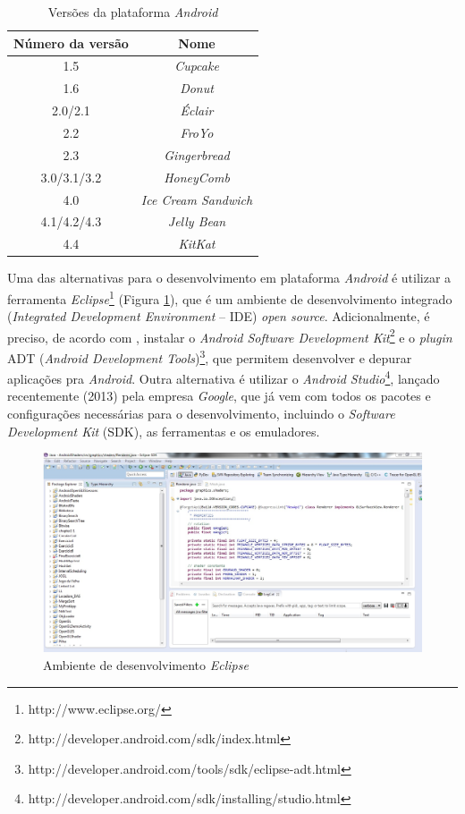 \begin{table}[h]
	\centering	
	\begin{tabular}{cc}
		\toprule
		\textbf{Número da versão} & \textbf{Nome}  \\
		\midrule
		1.5 &  \textit{Cupcake} \\
		1.6 & \textit{Donut} \\
		2.0/2.1 &  \textit{Éclair} \\
		2.2 & \textit{FroYo} \\
		2.3 &  \textit{Gingerbread} \\
		3.0/3.1/3.2 & \textit{HoneyComb} \\
		4.0 & \textit{Ice Cream Sandwich} \\
		4.1/4.2/4.3 & \textit{Jelly Bean} \\
		4.4 &  \textit{KitKat} \\

		\bottomrule
	\end{tabular}
	\caption{ Versões da plataforma \textit{Android}}
	\label{androidTab}
\end{table}

	Uma das alternativas para o desenvolvimento em plataforma \textit{Android} é utilizar a ferramenta \textit{Eclipse}\footnote{http://www.eclipse.org/} (Figura \ref{eclipse}), que é um ambiente de desenvolvimento integrado (\textit{Integrated Development Environment} -- IDE) \textit{open source}. Adicionalmente, é preciso, de acordo com \cite{androidsdkmanager}, instalar o \textit{Android Software Development Kit}\footnote{http://developer.android.com/sdk/index.html} e o \textit{plugin} ADT (\textit{Android Development Tools})\footnote{http://developer.android.com/tools/sdk/eclipse-adt.html}, que permitem desenvolver e depurar aplicações pra \textit{Android}. Outra alternativa é utilizar o \textit{Android Studio}\footnote{http://developer.android.com/sdk/installing/studio.html}, lançado recentemente (2013) pela empresa \textit{Google}, que já vem com todos os pacotes e configurações necessárias para o desenvolvimento, incluindo o  \textit{Software Development Kit} (SDK), as ferramentas e os emuladores. 

	\begin{figure}[h]
	\centering
		\includegraphics[keepaspectratio=true,scale=0.45]{figuras/eclipse.jpg}
	\caption{Ambiente de desenvolvimento \textit{Eclipse}}
	\label{eclipse}
	\end{figure}

